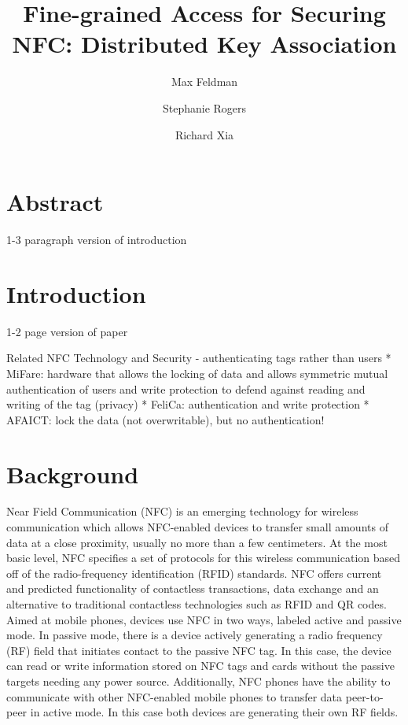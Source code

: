 \documentclass[12pt]{article}
\begin{document}
\title{Fine-grained Access for Securing NFC:  Distributed Key Association}
\author{Max Feldman \and Stephanie Rogers \and Richard Xia}
\maketitle

\section{Abstract}
1-3 paragraph version of introduction

\section{Introduction}
1-2 page version of paper



Related NFC Technology and Security - authenticating tags rather than users
* MiFare: hardware that allows the locking of data and allows symmetric mutual authentication of users and write protection to defend against reading and writing of the tag (privacy)
* FeliCa: authentication and write protection 
* AFAICT: lock the data (not overwritable), but no authentication!

\section{Background}
Near Field Communication (NFC) is an emerging technology for wireless communication which allows NFC-enabled devices to transfer small amounts of data at a close proximity, usually no more than a few centimeters. At the most basic level, NFC specifies a set of protocols for this wireless communication based off of the radio-frequency identification (RFID) standards. NFC offers current and predicted functionality of contactless transactions, data exchange and an alternative to traditional contactless technologies such as RFID and QR codes. Aimed at mobile phones, devices use NFC in two ways, labeled active and passive mode. In passive mode, there is a device actively generating a radio frequency (RF) field that initiates contact to the passive NFC tag. In this case, the device can read or write information stored on NFC tags and cards without the passive targets needing any power source. Additionally, NFC phones have the ability to communicate with other NFC-enabled mobile phones to transfer data peer-to-peer in active mode. In this case both devices are generating their own RF fields.
\end{document}

